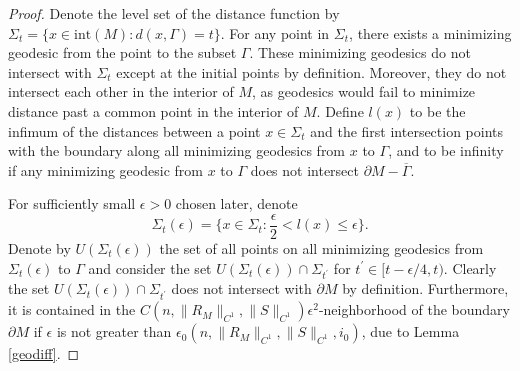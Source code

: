 \documentclass[11pt,letterpaper]{amsart}
\numberwithin{equation}{section}
\theoremstyle{definition}
\theoremstyle{plain}
\theoremstyle{definition}
\theoremstyle{plain}
\theoremstyle{definition}
\theoremstyle{plain}
\begin{document}
\begin{proof}
Denote the level set of the distance function by $\Sigma_t=\{x \in \textrm{int}(M): d(x,\Gamma)=t\}$. For any point in $\Sigma_t$, there exists a minimizing geodesic from the point to the subset $\Gamma$. These minimizing geodesics do not intersect with $\Sigma_t$ except at the initial points by definition. Moreover, they do not intersect each other in the interior of $M$, as geodesics would fail to minimize distance past a common point in the interior of $M$. Define $l(x)$ to be the infimum of the distances between a point $x\in \Sigma_t$ and the first intersection points with the boundary along all minimizing geodesics from $x$ to $\Gamma$, and to be infinity if any minimizing geodesic from $x$ to $\Gamma$ does not intersect $\partial M-\overline{\Gamma}$. 

For sufficiently small $\epsilon>0$ chosen later, denote 
$$\Sigma_t(\epsilon)=\big\{x\in \Sigma_t: \frac{\epsilon}{2}<l(x)\leqslant \epsilon \big\}.$$
Denote by $U(\Sigma_t(\epsilon))$ the set of all points on all minimizing geodesics from $\Sigma_t(\epsilon)$ to $\Gamma$ and consider the set $U(\Sigma_t(\epsilon))\cap \Sigma_{t^{\prime}}$ for $t^{\prime}\in [t-\epsilon/4,t)$. Clearly the set $U(\Sigma_t(\epsilon))\cap \Sigma_{t^{\prime}}$ does not intersect with $\partial M$ by definition. Furthermore, it is contained in the $C(n,\|R_M\|_{C^1},\|S\|_{C^1})\epsilon^2$-neighborhood of the boundary $\partial M$ if $\epsilon$ is not greater than $\epsilon_0(n,\|R_M\|_{C^1},\|S\|_{C^1},i_0)$, due to Lemma \ref{geodiff}. 


\end{proof}
\end{document}
